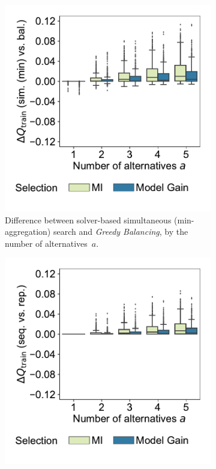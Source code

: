 \documentclass{article}
\theoremstyle{definition}
\begin{document}
\begin{figure}[p]
	\centering
	\begin{subfigure}[t]{0.48\textwidth}
		\centering
		\includegraphics[width=\textwidth, trim=15 30 15 15, clip]{plots/afs-impact-search-heuristics-metric-diff-sim-num-alternatives.pdf}
		\caption{
			Difference between solver-based simultaneous (min-aggregation) search and \emph{Greedy Balancing}, by the number of alternatives~$a$.
		}
		\label{fig:afs:impact-search-heuristics-metric-diff-sim-num-alternatives}
	\end{subfigure}
	\hfill
	\begin{subfigure}[t]{0.48\textwidth}
		\centering
		\includegraphics[width=\textwidth, trim=15 30 15 15, clip]{plots/afs-impact-search-heuristics-metric-diff-seq-num-alternatives.pdf}

\end{subfigure}
\end{figure}
\end{document}
